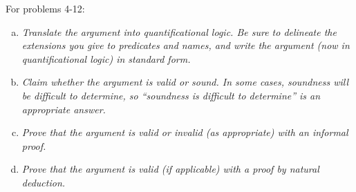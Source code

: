 \documentclass{article}
\begin{document}
\begin{flushleft}
      For problems 4-12:
\end{flushleft}
\begin{enumerate}[(a)]
      \item \textit{Translate the argument into quantificational logic. Be sure to delineate the extensions you give to predicates and names, and write the argument (now in quantificational logic) in standard form.}
      \item \textit{Claim whether the argument is valid or sound. In some cases, soundness will be difficult to determine, so “soundness is difficult to determine” is an appropriate answer.}
      \item \textit{Prove that the argument is valid or invalid (as appropriate) with an informal proof.}
      \item \textit{Prove that the argument is valid (if applicable) with a proof by natural deduction.}
\end{enumerate}
\end{document}
